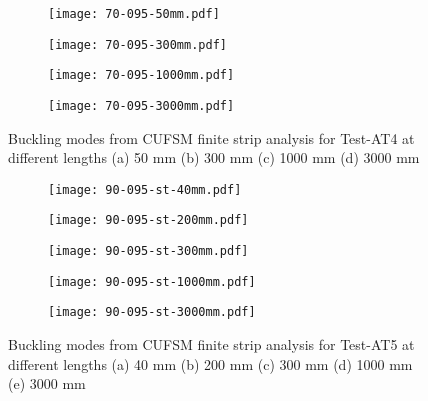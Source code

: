 \begin{figure}
	\centering
	\begin{subfigure}[b]{0.15\textwidth}
		\centering
		\texttt{[image: 70-095-50mm.pdf]}
		\caption{}
		\label{subfig:70-095-50mm}
	\end{subfigure}
	\begin{subfigure}[b]{0.15\textwidth}
		\centering
		\texttt{[image: 70-095-300mm.pdf]}
		\caption{}
		\label{subfig:70-095-300mm}
	\end{subfigure}
	\begin{subfigure}[b]{0.18\textwidth}
		\centering
		\texttt{[image: 70-095-1000mm.pdf]}
		\caption{}
		\label{subfig:70-095-1000mm}
	\end{subfigure}
	\begin{subfigure}[b]{0.18\textwidth}
		\centering
		\texttt{[image: 70-095-3000mm.pdf]}
		\caption{}
		\label{subfig:70-095-3000mm}
	\end{subfigure}
		\caption{Buckling modes from CUFSM finite strip analysis for Test-AT4 at different lengths (a) 50 mm (b) 300 mm (c) 1000 mm (d) 3000 mm}
		\label{fig:70-095-CUFSM-buckling}
\end{figure}
\begin{figure}
	\centering
	\begin{subfigure}[b]{0.15\textwidth}
		\centering
		\texttt{[image: 90-095-st-40mm.pdf]}
		\caption{}
		\label{subfig:90-095-st-40mm}
	\end{subfigure}
	\begin{subfigure}[b]{0.15\textwidth}
		\centering
		\texttt{[image: 90-095-st-200mm.pdf]}
		\caption{}
		\label{subfig:90-095-st-200mm}
	\end{subfigure}
	\begin{subfigure}[b]{0.15\textwidth}
		\centering
		\texttt{[image: 90-095-st-300mm.pdf]}
		\caption{}
		\label{subfig:90-095-st-300mm}
	\end{subfigure}
	\begin{subfigure}[b]{0.15\textwidth}
		\centering
		\texttt{[image: 90-095-st-1000mm.pdf]}
		\caption{}
		\label{subfig:90-095-st-1000mm}
	\end{subfigure}
	\begin{subfigure}[b]{0.15\textwidth}
		\centering
		\texttt{[image: 90-095-st-3000mm.pdf]}
		\caption{}
		\label{subfig:90-095-st-3000mm}
	\end{subfigure}
		\caption{Buckling modes from CUFSM finite strip analysis for Test-AT5 at different lengths (a) 40 mm (b) 200 mm (c) 300 mm (d) 1000 mm (e) 3000 mm}
		\label{fig:90-095-st-CUFSM-buckling}
\end{figure}

